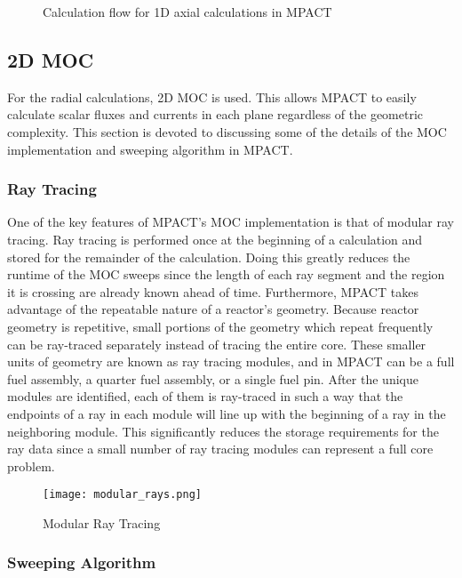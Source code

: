 \begin{figure}
  \centering
  
  \caption{Calculation flow for 1D axial calculations in MPACT}\label{f:Axial-flowchart}
\end{figure}

\subsection{2D MOC}

For the radial calculations, 2D MOC is used.  This allows MPACT to easily calculate scalar fluxes and currents in each plane regardless of the geometric complexity.  This section is devoted to discussing some of the details of the MOC implementation and sweeping algorithm in MPACT.

\subsubsection{Ray Tracing}

One of the key features of MPACT's MOC implementation is that of modular ray tracing.  Ray tracing is performed once at the beginning of a calculation and stored for the remainder of the calculation.  Doing this greatly reduces the runtime of the MOC sweeps since the length of each ray segment and the region it is crossing are already known ahead of time.  Furthermore, MPACT takes advantage of the repeatable nature of a reactor's geometry.  Because reactor geometry is repetitive, small portions of the geometry which repeat frequently can be ray-traced separately instead of tracing the entire core.  These smaller units of geometry are known as ray tracing modules, and in MPACT can be a full fuel assembly, a quarter fuel assembly, or a single fuel pin.  After the unique modules are identified, each of them is ray-traced in such a way that the endpoints of a ray in each module will line up with the beginning of a ray in the neighboring module.  This significantly reduces the storage requirements for the ray data since a small number of ray tracing modules can represent a full core problem.


\begin{figure}
\texttt{[image: modular\_rays.png]}
\caption{Modular Ray Tracing}\label{e:ModRays}
\end{figure}

\subsubsection{Sweeping Algorithm}

